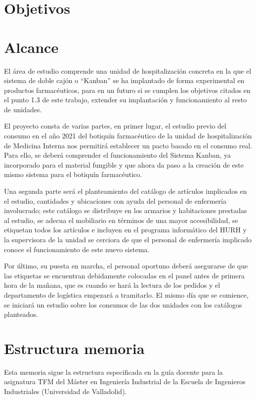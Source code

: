 \section{Objetivos}

\section{Alcance}

El área de estudio comprende una unidad de hospitalización concreta en la que el sistema de doble cajón o “Kanban” se ha implantado de forma experimental en productos farmacéuticos, para en un futuro si se cumplen los objetivos citados en el punto 1.3 de este trabajo, extender su implantación y funcionamiento al resto de unidades.

El proyecto consta de varias partes, en primer lugar, el estudio previo del consumo en el año 2021 del botiquín farmacéutico de la unidad de hospitalización de Medicina Interna nos permitirá establecer un pacto basado en el consumo real. Para ello, se deberá comprender el funcionamiento del Sistema Kanban, ya incorporado para el material fungible y que ahora da paso a la creación de este mismo sistema para el botiquín farmacéutico.

Una segunda parte será el planteamiento del catálogo de artículos implicados en el estudio, cantidades y ubicaciones con ayuda del personal de enfermería involucrado; este catálogo se distribuye en los armarios y habitaciones prestadas al estudio, se adecua el mobiliario en términos de una mayor accesibilidad, se etiquetan todos los artículos e incluyen en el programa informático del HURH y la supervisora de la unidad se cerciora de que el personal de enfermería implicado conoce el funcionamiento de este nuevo sistema.

Por último, su puesta en marcha, el personal oportuno deberá asegurarse de que las etiquetas se encuentran debidamente colocadas en el panel antes de primera hora de la mañana, que es cuando se hará la lectura de los pedidos y el departamento de logística empezará a tramitarlo. El mismo día que se comience, se iniciará un estudio sobre los consumos de las dos unidades con los catálogos planteados.

\section{Estructura memoria}

Esta memoria sigue la estructura especificada en la guía docente para la asignatura TFM del Máster en Ingeniería Industrial de la Escuela de Ingenieros Industriales (Universidad de Valladolid).\citeauthor{wombat2016}

